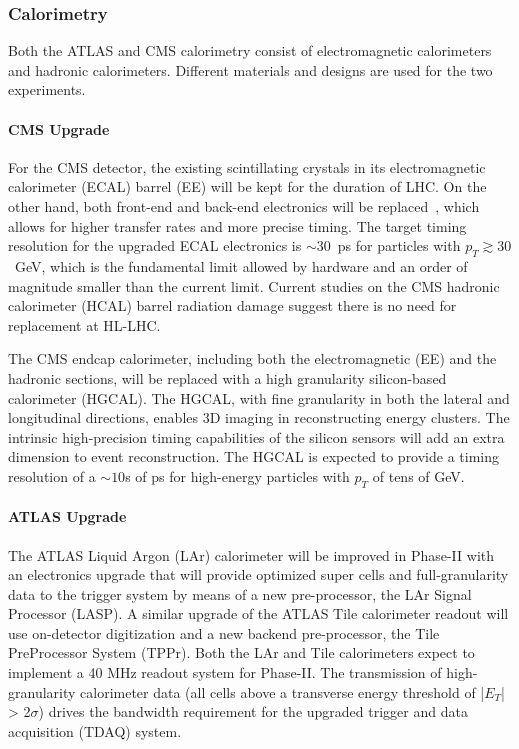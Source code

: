 \subsubsection{Calorimetry} \label{sec:upgradecalo}

Both the ATLAS and CMS calorimetry consist of electromagnetic calorimeters and hadronic calorimeters. Different materials and designs are used for the two experiments. 

\paragraph{CMS Upgrade} 
For the CMS detector, the existing scintillating crystals in its electromagnetic calorimeter (ECAL) barrel (EE) will be kept for the duration of LHC. On the other hand, both front-end and back-end electronics will be replaced~\cite{Lourenco:2283187}, which allows for higher transfer rates and more precise timing. The target timing resolution for the upgraded ECAL electronics is $\sim30$~ps for particles with $p_T \gtrsim30$~GeV, which is the fundamental limit allowed by hardware and an order of magnitude smaller than the current limit. 
Current studies on the CMS hadronic calorimeter (HCAL) barrel radiation damage suggest there is no need for replacement at HL-LHC. 

The CMS endcap calorimeter, including both the electromagnetic (EE) and the hadronic sections, will be replaced with a high granularity silicon-based calorimeter (HGCAL). 
The HGCAL, with fine granularity in both the lateral and longitudinal directions, enables 3D imaging in reconstructing energy clusters.
The intrinsic high-precision timing capabilities of the silicon sensors will add an extra dimension to event reconstruction. The HGCAL is expected to provide a timing resolution of a $\sim10$s of ps for high-energy particles with $p_T$ of tens of GeV. 

\paragraph{ATLAS Upgrade}

The ATLAS Liquid Argon (LAr) calorimeter will be improved in Phase-II with an electronics upgrade that will
provide optimized super cells and full-granularity data to the trigger system by means of a
new pre-processor, the LAr Signal Processor (LASP). A similar upgrade of the ATLAS Tile calorimeter
readout will use on-detector digitization and a new backend pre-processor, the Tile PreProcessor
System (TPPr). Both the LAr and Tile calorimeters expect to implement a 40 MHz
readout system for Phase-II. 
The transmission of high-granularity calorimeter data (all cells above a transverse energy
threshold of |$E_T$| > 2$\sigma$) drives the bandwidth requirement for the upgraded trigger and data acquisition (TDAQ) system.

